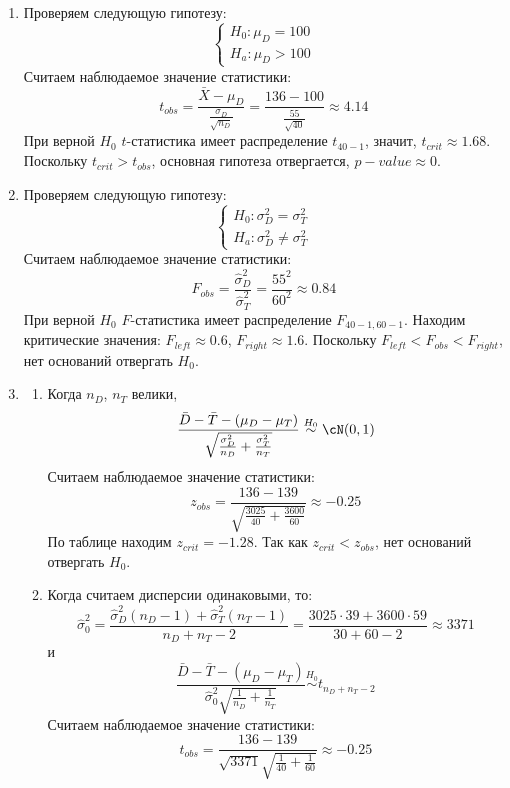 \begin{enumerate}
\item Проверяем следующую гипотезу:
\[
\begin{cases}
H_0: \mu_{D} = 100 \\
H_a: \mu_{D} > 100
\end{cases}
\]
Считаем наблюдаемое значение статистики:
\[
t_{obs} = \frac{\bar X - \mu_{D}}{\frac{\sigma_D}{\sqrt{n_D}}} = \frac{136 - 100}{\frac{55}{\sqrt{40}}} \approx 4.14
\]
При верной $H_0$ $t$-статистика имеет распределение $t_{40 - 1}$, значит, $t_{crit} \approx 1.68$.
Поскольку $t_{crit} > t_{obs}$, основная гипотеза отвергается, $p-value \approx 0$.

\item Проверяем следующую гипотезу:
\[
\begin{cases}
H_0: \sigma^2_D = \sigma^2_T \\
H_a: \sigma^2_D \neq \sigma^2_T
\end{cases}
\]
Считаем наблюдаемое значение статистики:
\[
F_{obs} = \frac{\hat{\sigma}^2_D}{\hat{\sigma}^2_T} = \frac{55^2}{60^2} \approx 0.84
\]
При верной $H_0$ $F$-статистика имеет распределение $F_{40-1, 60-1}$.
Находим критические значения: $F_{left} \approx 0.6$, $F_{right} \approx 1.6$.
Поскольку $F_{left} < F_{obs} < F_{right}$, нет оснований отвергать $H_0$.
\item
\begin{enumerate}
Проверяем гипотезу
\[
\begin{cases}
H_0: \mu_{D} = \mu_{T} \\
H_a: \mu_{D} < \mu_{T}
\end{cases}
\]
\item Когда $n_D$, $n_T$ велики,
\[
\frac{\bar D - \bar T - (\mu_D - \mu_T)}{\sqrt{\frac{\sigma^2_D}{n_D} + \frac{\sigma^2_T}{n_T}}} \stackrel{H_0}{\sim} \cN(0, 1)
\]
Считаем наблюдаемое значение статистики:
\[
z_{obs} = \frac{136 - 139}{\sqrt{\frac{3025}{40} + \frac{3600}{60}}} \approx -0.25
\]
По таблице находим $z_{crit} = -1.28$.
Так как $z_{crit} < z_{obs}$, нет оснований отвергать $H_0$.
\item Когда считаем дисперсии одинаковыми, то:
\[
\hat{\sigma}^2_0 = \frac{\hat{\sigma}^2_D (n_D - 1) + \hat{\sigma}^2_T (n_T - 1)}{n_D + n_T - 2} = \frac{3025 \cdot 39 + 3600 \cdot 59}{30 + 60 - 2} \approx 3371
\]
и
\[
\frac{\bar D - \bar T - (\mu_D - \mu_T)}{\hat{\sigma}^2_0\sqrt{\frac{1}{n_D} + \frac{1}{n_T}}} \stackrel{H_0}{\sim} t_{n_D + n_T - 2}
\]
Считаем наблюдаемое значение статистики:
\[
t_{obs} = \frac{136 - 139}{\sqrt{3371}\sqrt{\frac{1}{40} + \frac{1}{60}}} \approx -0.25
\]
\end{enumerate}
\end{enumerate}
